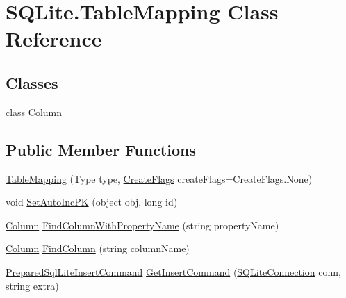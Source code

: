 \hypertarget{class_s_q_lite_1_1_table_mapping}{\section{S\+Q\+Lite.\+Table\+Mapping Class Reference}
\label{class_s_q_lite_1_1_table_mapping}
}
\subsection*{Classes}
\begin{DoxyCompactItemize}
\item 
class \hyperlink{class_s_q_lite_1_1_table_mapping_1_1_column}{Column}
\end{DoxyCompactItemize}
\subsection*{Public Member Functions}
\begin{DoxyCompactItemize}
\item 
\hyperlink{class_s_q_lite_1_1_table_mapping_a13e595aa07061915a33b2346497bd786}{Table\+Mapping} (Type type, \hyperlink{namespace_s_q_lite_a5ada328810363319c85c3e0c28c67479}{Create\+Flags} create\+Flags=Create\+Flags.\+None)
\item 
void \hyperlink{class_s_q_lite_1_1_table_mapping_a02f2ce7280201f572621b75e106add15}{Set\+Auto\+Inc\+P\+K} (object obj, long id)
\item 
\hyperlink{class_s_q_lite_1_1_table_mapping_1_1_column}{Column} \hyperlink{class_s_q_lite_1_1_table_mapping_ab71131c8ed49c2c5276a555af0d564f2}{Find\+Column\+With\+Property\+Name} (string property\+Name)
\item 
\hyperlink{class_s_q_lite_1_1_table_mapping_1_1_column}{Column} \hyperlink{class_s_q_lite_1_1_table_mapping_a1b6aca5cdaa9c0f8b6f5c1ecbb12affc}{Find\+Column} (string column\+Name)
\item 
\hyperlink{class_s_q_lite_1_1_prepared_sql_lite_insert_command}{Prepared\+Sql\+Lite\+Insert\+Command} \hyperlink{class_s_q_lite_1_1_table_mapping_a858d8d3031d8fca47fbc24a0bc752177}{Get\+Insert\+Command} (\hyperlink{class_s_q_lite_1_1_s_q_lite_connection}{S\+Q\+Lite\+Connection} conn, string extra)
\end{DoxyCompactItemize}
